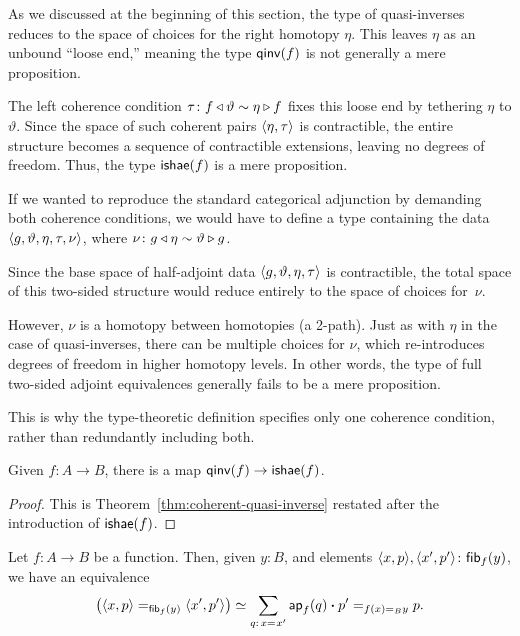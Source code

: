\begin{rem}\label{rem:why-half}
    As we discussed at the beginning of this section, the type of quasi-inverses reduces to the space of choices for the right homotopy $\eta$. This leaves $\eta$ as an unbound ``loose end,'' meaning the type $\mathsf{qinv}(f)$ is not generally a mere proposition.
    
    The left coherence condition $\tau\colon f\lwct\vartheta\sim\eta\rwct f$ fixes this loose end by tethering $\eta$ to $\vartheta$. Since the space of such coherent pairs $\langle\eta,\tau\rangle$ is contractible, the entire structure becomes a sequence of contractible extensions, leaving no degrees of freedom. Thus, the type $\mathsf{ishae}(f)$ is a mere proposition.
    
    If we wanted to reproduce the standard categorical adjunction by demanding both coherence conditions, we would have to define a type containing the data $\langle g,\vartheta,\eta,\tau,\nu\rangle$, where $\nu\colon g\lwct\eta\sim\vartheta\rwct g$.
    
    Since the base space of half-adjoint data $\langle g,\vartheta,\eta,\tau\rangle$ is contractible, the total space of this two-sided structure would reduce entirely to the space of choices for~$\nu$.
    
    However, $\nu$ is a homotopy between homotopies (a 2-path). Just as with $\eta$ in the case of quasi-inverses, there can be multiple choices for $\nu$, which re-introduces degrees of freedom in higher homotopy levels. In other words, the type of full two-sided adjoint equivalences generally fails to be a mere proposition.
    
    This is why the type-theoretic definition specifies only one coherence condition, rather than redundantly including both.
\end{rem}

\begin{thm}\label{thm:qinv->ishae}
    Given\/ $f\colon A\to B$, there is a map\/ $\mathsf{qinv}(f)\to\mathsf{ishae}(f)$.
\end{thm}

\begin{proof}
    This is Theorem~\ref{thm:coherent-quasi-inverse} restated after the introduction of $\mathsf{ishae}(f)$.
\end{proof}

\begin{lem}\label{lem:fib-equality}
    Let\/ $f\colon A\to B$ be a function. Then, given\/ $y\colon B$, and elements\/ $\dep{x,p},\dep{x',p'}\colon\fun{fib}_f(y)$, we have an equivalence
    \[
        \bigl(
            \dep{x,p}\eq{\fun{fib}_f(y)}\dep{x',p'}
        \bigr)
        \simeq
        \sum_{q\colon x\eq{}x'}
            \fun{ap}_f(q)\ct p'\eq{f(x)\eq By}p.
    \]
\end{lem}

